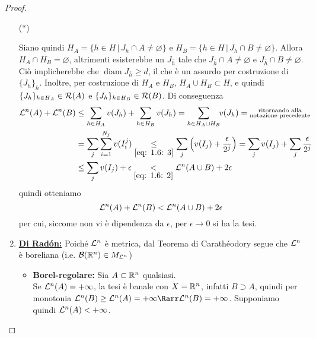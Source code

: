 \begin{proof}
\begin{enumerate}[label=\textbf{\Large\arabic*.}, ref=\textbf{\underline{(\arabic*)}}]
\begin{imgbox}{{\large($*$)}}
        \end{imgbox}
        Siano quindi $H_A =\{h\in H\, |\, J_h\cap A\neq \varnothing\}$ e $H_B =\{h\in H\, |\, J_h\cap B\neq \varnothing\}$. Allora $H_A\cap H_B=\varnothing$, altrimenti esisterebbe un $J_{\bar h}$ tale che $J_{\bar h}\cap A\neq \varnothing$ e $J_{\bar h}\cap B\neq \varnothing$. Ciò implicherebbe che $\operatorname{diam} J_{\bar h}\geq d$, il che è un assurdo per costruzione di $\{J_h\}_h$. Inoltre, per costruzione di $H_A$ e $H_B$, $H_A\cup H_B\subset H$, e quindi $\{J_h\}_{h\in H_A}\in \mathcal{R}(A)$ e $\{J_h\}_{h\in H_B}\in \mathcal{R}(B)$. Di conseguenza
        \[\begin{aligned}\mathcal{L}^n(A)+\mathcal{L}^n(B) &\leq \sum_{h\in H_A}v(J_h)+\sum_{h\in H_B}v(J_h)=\sum_{h\in H_A\sqcup H_B}\!\!v(J_h) = \substack{\text{ritornando alla}\\\text{notazione precedente}}\\ &= \sum_{j}\sum_{i=1}^{N_j}v(I_i^j)\underset{\eqref{eq: 1.6: 3}}{\leq} \sum_j\left( v(I_j)+\frac{\epsilon}{2^j} \right) = \sum_j v(I_j)+\sum_j\frac{\epsilon}{2^j} \\ & \leq \sum_j v(I_j)+\epsilon \underset{\eqref{eq: 1.6: 2}}< \mathcal{L}^n(A\cup B) +2\epsilon \end{aligned}\]
        quindi otteniamo 
        \[\mathcal{L}^n(A)+\mathcal{L}^n(B) < \mathcal{L}^n(A\cup B) +2\epsilon \]
        per cui, siccome non vi è dipendenza da $\epsilon$, per $\epsilon\to 0$ si ha la tesi.
        \item \textbf{\underline{Di Radón:}} Poiché $\mathcal{L}^n$ è metrica, dal Teorema di Carathéodory segue che $\mathcal{L}^n$ è boreliana (i.e. $\mathcal{B}(\mathbb{R}^n)\in M_{\mathcal{L}^n}$)
        \begin{itemize}
            \item \textbf{Borel-regolare:} Sia $A\subset \mathbb{R}^n$ qualsiasi. \hspace{\fill}\\
            Se $\mathcal{L}^n(A)=+\infty$, la tesi è banale con $X=\mathbb{R}^n$, infatti $B\supset A$, quindi per monotonia $\mc{L}^n(B)\geq \mc{L}^n(A)=+\infty\Rarr \mc{L}^n(B)=+\infty$. Supponiamo quindi $\mathcal{L}^n(A)<+\infty$.\\

\end{itemize}
\end{enumerate}
\end{proof}
